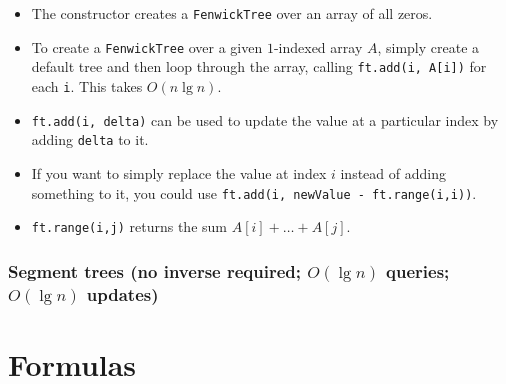 \documentclass[10pt]{book}
\newif\iftodos
\newcommand{\todo}[1]{\iftodos\textcolor{red}{[TODO: #1]}\fi}
\begin{document}
\begin{itemize}
\item The constructor creates a \texttt{FenwickTree} over an array of
  all zeros.
\item To create a \texttt{FenwickTree} over a given $1$-indexed array
  $A$, simply create a default tree and then loop through the array,
  calling \texttt{ft.add(i, A[i])} for each \texttt{i}.  This takes
  $O(n \lg n)$.
\item \texttt{ft.add(i, delta)} can be used to update the value at a
  particular index by adding \texttt{delta} to it.
\item If you want to simply replace the value at index $i$ instead of
  adding something to it, you could use \texttt{ft.add(i, newValue - ft.range(i,i))}.
\item \texttt{ft.range(i,j)} returns the sum $A[i] + \dots + A[j]$.
\end{itemize}

\todo{Discuss CP3 presentation of Fenwick trees; explain how Fenwick
  trees work}

\subsection{Segment trees (no inverse required; $O(\lg n)$ queries;
  $O(\lg n)$ updates)} \label{sec:segment-trees}

\todo{Segment trees.}

\chapter{Formulas} \label{chap:formulas}
\end{document}
